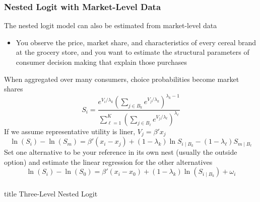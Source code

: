 \documentclass{beamer}
\begin{document}
\begin{frame}\frametitle{Nested Logit with Market-Level Data}
    The nested logit model can also be estimated from market-level data
    \begin{itemize}
    	\item You observe the price, market share, and characteristics of every cereal brand at the grocery store, and you want to estimate the structural parameters of consumer decision making that explain those purchases
    \end{itemize}
    \vspace{1ex}
    When aggregated over many consumers, choice probabilities become market shares
    $$S_i = \frac{e^{V_{i} / \lambda_k} \left( \sum_{j \in B_k} e^{V_{j} / \lambda_k} \right)^{\lambda_k - 1}}{\sum_{\ell = 1}^K \left( \sum_{j \in B_{\ell}} e^{V_{j} / \lambda_{\ell}} \right)^{\lambda_{\ell}}}$$
    If we assume representative utility is liner, $V_j = \beta' x_j$
    $$\ln(S_i) - \ln(S_m) = \beta' (x_i - x_j) + (1 - \lambda_k) \ln S_{i \mid B_k} - (1 - \lambda_{\ell}) S_{m \mid B_{\ell}}$$
    Set one alternative to be your reference in its own nest (usually the outside option) and estimate the linear regression for the other alternatives
    $$\ln(S_i) - \ln(S_0) = \beta' (x_i - x_0) + (1 - \lambda_k) \ln (S_{i \mid B_k}) + \omega_i$$
\end{frame}

\begin{frame}\frametitle{}
    \vfill
    \centering
    \begin{beamercolorbox}[center]{title}
        \Large Three-Level Nested Logit
    \end{beamercolorbox}
    \vfill
\end{frame}
\end{document}
